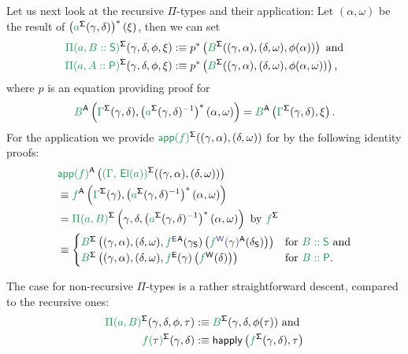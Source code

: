 \begin{defn}
Let us next look at the recursive $\Pi$-types and their application:
Let $(\alpha, \omega)$ be the result of
$\left(\grm{a}^\Sg(\gamma, \delta)\right)^*(\xi)$, then
we can set
\begin{align*}
\grm{\Pi(a, B :: \Sc)}^\Sg(\gamma, \delta, \phi, \xi)
  &:\equiv p^*\left(\grm{B}^\Sg((\gamma, \alpha), (\delta, \omega), \phi(\alpha))\right)
    \text{ and} \\
\grm{\Pi(a, A :: \Pc)}^\Sg(\gamma, \delta, \phi, \xi)
  &:\equiv p^*\left(\grm{B}^\Sg((\gamma, \alpha), (\delta, \omega), \phi(\alpha, \omega))\right)
    \text{,}
\end{align*}
where $p$ is an equation providing proof for
\begin{equation*}
\grm{B}^\CC\left(\grm{\Gamma}^\Sg(\gamma, \delta), \left(\grm{a}^\Sg(\gamma, \delta)\inv\right)^*(\alpha, \omega) \right)
  = \grm{B}^\CC\left(\grm{\Gamma}^\Sg(\gamma, \delta), \xi \right) \text{.}
\end{equation*}
For the application we provide 
$\grm{\IIapp(f)}^\Sg((\gamma, \alpha), (\delta, \omega))$ for
 by the following
identity proofs:
\begin{align*}
  & \grm{\IIapp(f)}^\CC\left(\grm{(\Gamma,\,\El(a))}^\Sg((\gamma, \alpha), (\delta, \omega))\right) \\
  &\equiv \grm{f}^\CC\left(\grm{\Gamma}^\Sg(\gamma), \left(\grm{a}^\Sg(\gamma, \delta)\inv\right)^*(\alpha, \omega)\right) \\
  &= \grm{\Pi(a, B)}^\Sg\left(\gamma, \delta, \left(\grm{a}^\Sg(\gamma, \delta)\inv\right)^*(\alpha, \omega)\right) \text{ by $\grm{f}^\Sg$}\\
  &\equiv 
    \begin{cases}
    \grm{B}^\Sg\left((\gamma, \alpha), (\delta, \omega),
    \tqm{\grm{f}^\EE }^\CC(\gamma_\Sc)
      \left(\tqm{\grm{f}^\WW(\blgamma)}^\CC(\delta_\Sc)\right)\right)
     & \text{for \grm{B :: \Sc} and} \\
    \grm{B}^\Sg\left((\gamma, \alpha), (\delta, \omega),
     \grm{f}^\EE(\gamma)\left(\grm{f}^\WW(\delta)\right)\right)
     & \text{for \grm{B :: \Pc}.}
    \end{cases}
\end{align*}

The case for non-recursive $\Pi$-types is a rather straightforward descent,
compared to the recursive ones:
\begin{align*}
\grm{\Pi(a, B)}^\Sg(\gamma, \delta, \phi, \tau)
  &:\equiv \grm{B}^\Sg(\gamma, \delta, \phi(\tau)) \text{ and}\\
\grm{f(\bltau)}^\Sg(\gamma, \delta)
  &:\equiv \happly\left(\grm{f}^\Sg(\gamma, \delta), \tau\right)
\end{align*}


\end{defn}
